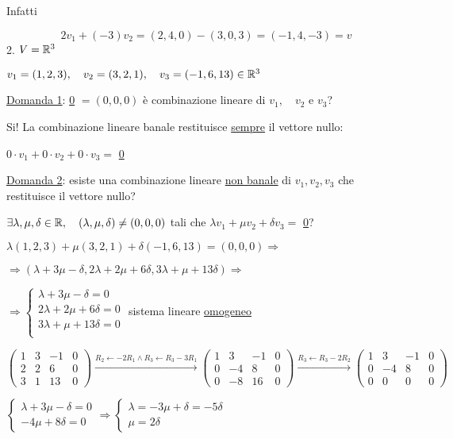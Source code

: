 \documentclass{article}
\begin{document}
   Infatti

   $$2v_1+(-3)v_2=(2,4,0)-(3,0,3)=(-1,4,-3)=v$$
2. $V=\mathbb{R}^3$

   $v_1=(1,2,3),\quad v_2=(3,2,1),\quad v_3=(-1,6,13)\in\mathbb{R}^3$

   \ul{Domanda 1}: \ul{0} $=(0,0,0)$ è combinazione lineare di $v_1,\quad v_2$ e $v_3$?

   Si! La combinazione lineare banale restituisce \ul{sempre} il vettore nullo:

   $0\cdot v_1+0\cdot v_2+0\cdot v_3=$ \ul{0}

   \ul{Domanda 2}: esiste una combinazione lineare \ul{non banale} di $v_1,v_2,v_3$ che restituisce il vettore nullo?

   $\exists\lambda,\mu,\delta\in\mathbb{R},\quad(\lambda,\mu,\delta)\not=(0,0,0)$ tali che $\lambda v_1+\mu v_2+\delta v_3=$ \ul{0}?

   $\lambda(1,2,3)+\mu(3,2,1)+\delta(-1,6,13)=(0,0,0)\Rightarrow$

   $\Rightarrow(\lambda+3\mu-\delta,2\lambda+2\mu+6\delta,3\lambda+\mu+13\delta)\Rightarrow$

   $\Rightarrow
   \begin{cases}
    \lambda+3\mu-\delta=0\\
    2\lambda+2\mu+6\delta=0\\
    3\lambda+\mu+13\delta=0\\
   \end{cases}$ sistema lineare \ul{omogeneo}

   $\begin{pmatrix}
     1&3&-1&0\\
     2&2&6&0\\
     3&1&13&0
   \end{pmatrix}\xrightarrow{R_2\leftarrow-2R_1\wedge R_3\leftarrow R_3-3R_1}
   \begin{pmatrix}
   1&3&-1&0\\
   0&-4&8&0\\
   0&-8&16&0
   \end{pmatrix}\xrightarrow{R_3\leftarrow R_3-2R_2}
   \begin{pmatrix}
   1&3&-1&0\\
   0&-4&8&0\\
   0&0&0&0
   \end{pmatrix}$

   $\begin{cases}
     \lambda+3\mu-\delta=0\\
     -4\mu+8\delta=0
   \end{cases}\Rightarrow
   \begin{cases}
   \lambda=-3\mu+\delta=-5\delta\\
   \mu=2\delta
   \end{cases}$
\end{document}
